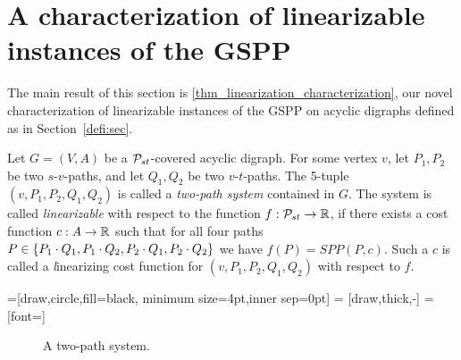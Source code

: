 \section{A characterization of linearizable instances of  the GSPP}\label{charact:sec}
 The main result of this section is \cref{thm_linearization_characterization}, our novel characterization of  linearizable instances of the GSPP on acyclic digraphs defined as in Section~\ref{defi:sec}. 
\begin{definition}
Let $G=(V,A)$ be a $\mathcal{P}_{st}$-covered acyclic digraph. For some vertex $v$, let $P_1, P_2$ be two $s$-$v$-paths, and let $Q_1, Q_2$ be two $v$-$t$-paths. The 5-tuple $(v,P_1,P_2,Q_1,Q_2)$ is called a \emph{two-path system} contained in $G$. The system is called \emph{linearizable} with respect to the function $f : \mathcal{P}_{st} \rightarrow \mathbb{R}$, if there exists a cost function $c : A \rightarrow \mathbb{R}$ such that for all four paths $P \in \{ P_1 \cdot Q_1, P_1 \cdot Q_2, P_2 \cdot Q_1, P_2 \cdot Q_2 \}$ we have $f(P) = SPP(P,c)$. Such a $c$ is called  a {\emph linearizing cost function} for  $(v,P_1,P_2,Q_1,Q_2)$ with respect to $f$. 
\end{definition}

=[draw,circle,fill=black, minimum size=4pt,inner sep=0pt]
 = [draw,thick,-]
 = [font=\small]
\begin{figure}[bth]
\centering
{}
\caption{A two-path system.}
 \label{fig:two-path-system}
\end{figure}


